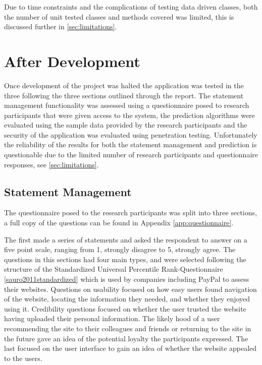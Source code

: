 Due to time constraints and the complications of testing data driven classes, both the number of unit tested classes and methods covered was limited, this is discussed further in \autoref{sec:limitations}.

\section{After Development}
Once development of the project was halted the application was tested in the three following the three sections outlined through the report. The statement management functionality was assessed using a questionnaire posed to research participants that were given access to the system, the prediction algorithms were evaluated using the sample data provided by the research participants and the security of the application was evaluated using penetration testing.
%
Unfortunately the reliability of the results for both the statement management and prediction is questionable due to the limited number of research participants and questionnaire responses, see \autoref{sec:limitations}.


\subsection{Statement Management}
The questionnaire posed to the research participants was split into three sections, a full copy of the questions can be found in Appendix \ref{app:questionnaire}.

The first made a series of statements and asked the respondent to answer on a five point scale, ranging from 1, strongly disagree to 5, strongly agree. The questions in this sections had four main types, and were selected following the structure of the Standardized Universal Percentile Rank-Questionnaire \ref{sauro2011standardized} which is used by companies including PayPal to assess their websites. 
%
Questions on usability focused on how easy users found navigation of the website, locating the information they needed, and whether they enjoyed using it.
%
Credibility questions focused on whether the user trusted the website having uploaded their personal information.
%
The likely hood of a user recommending the site to their colleagues and friends or returning to the site in the future gave an idea of the potential loyalty the participants expressed.
%
The last focused on the user interface to gain an idea of whether the website appealed to the users.

